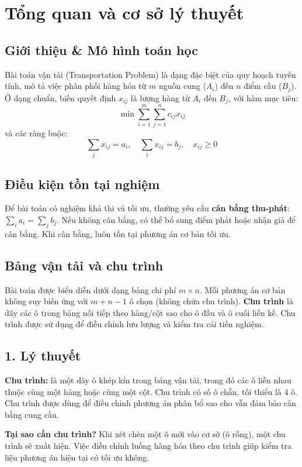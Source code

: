 \chapter{Tổng quan và cơ sở lý thuyết}
\section{Giới thiệu \& Mô hình toán học}
Bài toán vận tải (Transportation Problem) là dạng đặc biệt của quy hoạch tuyến tính, mô tả việc phân phối hàng hóa từ $m$ nguồn cung ($A_i$) đến $n$ điểm cầu ($B_j$). Ở dạng chuẩn, biến quyết định $x_{ij}$ là lượng hàng từ $A_i$ đến $B_j$, với hàm mục tiêu:
\[
\min \sum_{i=1}^m \sum_{j=1}^n c_{ij} x_{ij}
\]
và các ràng buộc:
\[
\sum_j x_{ij} = a_i,\quad \sum_i x_{ij} = b_j,\quad x_{ij} \geq 0
\]

\section{Điều kiện tồn tại nghiệm}
Để bài toán có nghiệm khả thi và tối ưu, thường yêu cầu \textbf{cân bằng thu-phát}: $\sum_i a_i = \sum_j b_j$. Nếu không cân bằng, có thể bổ sung điểm phát hoặc nhận giả để cân bằng. Khi cân bằng, luôn tồn tại phương án cơ bản tối ưu.

\section{Bảng vận tải và chu trình}
Bài toán được biểu diễn dưới dạng bảng chi phí $m \times n$. Mỗi phương án cơ bản không suy biến ứng với $m+n-1$ ô chọn (không chứa chu trình). \textbf{Chu trình} là dãy các ô trong bảng nối tiếp theo hàng/cột sao cho ô đầu và ô cuối liền kề. Chu trình được sử dụng để điều chỉnh lưu lượng và kiểm tra cải tiến nghiệm.

\section*{1. Lý thuyết}

\textbf{Chu trình:} là một dãy ô khép kín trong bảng vận tải, trong đó các ô liền nhau thuộc cùng một hàng hoặc cùng một cột. Chu trình có số ô chẵn, tối thiểu là 4 ô. Chu trình được dùng để điều chỉnh phương án phân bổ sao cho vẫn đảm bảo cân bằng cung cầu.

\textbf{Tại sao cần chu trình?} Khi xét chèn một ô mới vào cơ sở (ô rỗng), một chu trình sẽ xuất hiện. Việc điều chỉnh luồng hàng hóa theo chu trình giúp kiểm tra liệu phương án hiện tại có tối ưu không.

